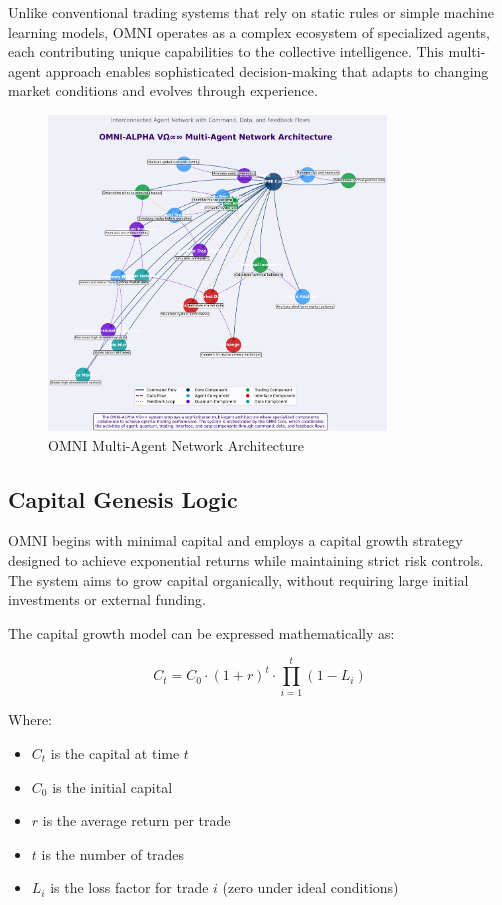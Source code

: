 \documentclass[11pt,a4paper]{article}
\begin{document}
Unlike conventional trading systems that rely on static rules or simple machine learning models, OMNI operates as a complex ecosystem of specialized agents, each contributing unique capabilities to the collective intelligence. This multi-agent approach enables sophisticated decision-making that adapts to changing market conditions and evolves through experience.

\begin{figure}[H]
    \centering
    \includegraphics[width=0.8\textwidth]{images/agent_network_advanced.png}
    \caption{OMNI Multi-Agent Network Architecture}
    \label{fig:agent_network}
\end{figure}

\subsection{Capital Genesis Logic}

OMNI begins with minimal capital and employs a capital growth strategy designed to achieve exponential returns while maintaining strict risk controls. The system aims to grow capital organically, without requiring large initial investments or external funding.

The capital growth model can be expressed mathematically as:

\begin{equation}
    C_t = C_0 \cdot (1 + r)^t \cdot \prod_{i=1}^{t} (1 - L_i)
\end{equation}

Where:
\begin{itemize}
    \item $C_t$ is the capital at time $t$
    \item $C_0$ is the initial capital
    \item $r$ is the average return per trade
    \item $t$ is the number of trades
    \item $L_i$ is the loss factor for trade $i$ (zero under ideal conditions)
\end{itemize}
\end{document}
